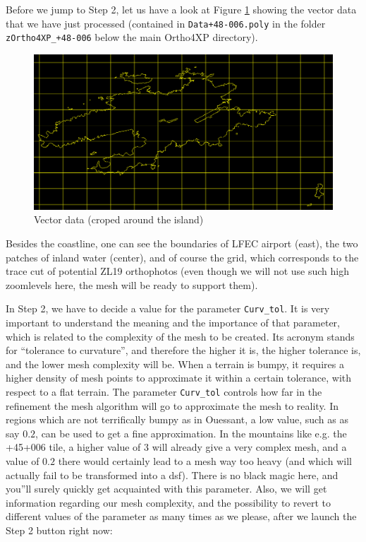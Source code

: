 \documentclass[12pt]{article}
\begin{document}
Before we jump to Step 2, let us have a look at Figure \ref{fig:poly} showing the vector data that we have just processed (contained in {\tt Data+48-006.poly} in the folder {\tt zOrtho4XP\_+48-006} below the main Ortho4XP directory).
\begin{center}
\begin{figure}[!ht]
\begin{center}
\includegraphics[width=14cm]{Images/ouessant_poly.png}
\caption{\label{fig:poly}Vector data (croped around the island)}
\end{center}
\end{figure}
\end{center}
Besides the coastline, one can see the boundaries of LFEC airport (east), the two patches of inland water (center), and of course the grid, which corresponds to the trace cut of potential ZL19 orthophotos (even though we will not use such high zoomlevels here, the mesh will be ready to support them).

\medskip

In Step 2, we have to decide a value for the parameter {\tt Curv\_tol}. It is very important to understand the meaning and the importance of that parameter, which is related to the complexity of the mesh to be created. Its acronym stands for ``tolerance to curvature'', and therefore the higher it is, the higher tolerance is, and the lower mesh complexity will be. When a terrain is bumpy, it requires a higher density of mesh points to approximate it within a certain tolerance, with respect to a flat terrain.
The parameter {\tt Curv\_tol} controls how far in the refinement the mesh algorithm will go to approximate the mesh to reality. In regions which are not terrifically bumpy as in Ouessant, a low value, such as as say $0.2$, can be used to get a fine approximation. In the mountains like e.g. the +45+006 tile, a higher value of $3$ will already give a very complex mesh, and a value of $0.2$ there would certainly lead to a mesh way too heavy (and which will actually fail to be transformed into a dsf). There is no black magic here, and you''ll surely quickly get acquainted with this parameter.
Also, we will get information regarding our mesh complexity, and the possibility to revert to different values of the parameter as many times as we please, after we launch the Step 2 button right now:
\end{document}
